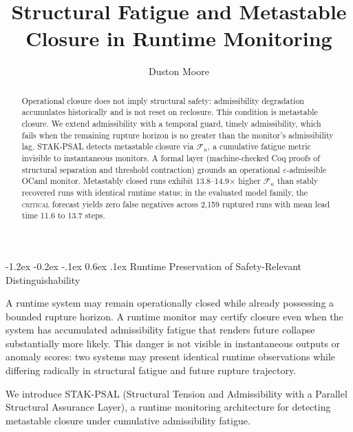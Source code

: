 \documentclass{llncs}
\makeatletter
\renewcommand\section{\@startsection{section}{1}{\z@}%
  {-1.2ex \@plus -0.2ex \@minus -.1ex}%
  {0.6ex \@plus .1ex}%
  {\normalfont\large\bfseries}}
\newcommand{\st}[1]{\textup{\textsc{#1}}}
\makeatother
\begin{document}
\title{Structural Fatigue and Metastable Closure in Runtime Monitoring}
\author{Duston Moore}
\maketitle

\begin{abstract}
Operational closure does not imply structural safety: admissibility
degradation accumulates historically and is not reset on reclosure. This
condition is metastable closure. We extend admissibility with a temporal guard, timely admissibility, which fails when the remaining rupture horizon is no greater than the monitor's admissibility lag. STAK-PSAL detects metastable closure via $\mathcal{F}_n$,
a cumulative fatigue metric invisible to instantaneous monitors. A formal
layer (machine-checked Coq proofs of structural separation and threshold contraction) grounds an operational
$\varepsilon$-admissible OCaml monitor. Metastably closed runs exhibit
13.8--14.9$\times$ higher $\mathcal{F}_n$ than stably recovered runs
with identical runtime status; in the evaluated model family, the
\st{critical} forecast yields zero false negatives across 2,159 ruptured
runs with mean lead time 11.6 to 13.7 steps.
\end{abstract}

\section{Runtime Preservation of Safety-Relevant Distinguishability}
\label{sec:problem}

A runtime system may remain operationally closed while already possessing
a bounded rupture horizon. A runtime monitor may certify closure even
when the system has accumulated admissibility fatigue that renders future
collapse substantially more likely. This danger is not visible in
instantaneous outputs or anomaly scores: two systems may present
identical runtime observations while differing radically in structural
fatigue and future rupture trajectory.

We introduce STAK-PSAL (Structural Tension and Admissibility with a
Parallel Structural Assurance Layer), a runtime monitoring architecture
for detecting metastable closure under cumulative admissibility fatigue.
\end{document}

